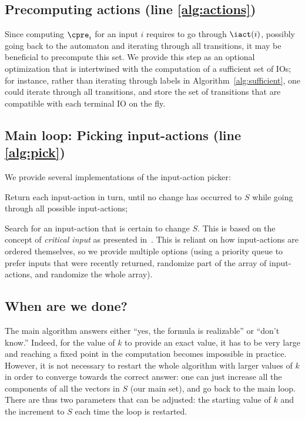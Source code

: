 \documentclass[runningheads,a4paper]{llncs}
\begin{document}
\subsection{Precomputing actions (line \ref{alg:actions})}

Since computing \(\cpre_i\) for an input \(i\) requires to go through
\(\iact(i)\), possibly going back to the automaton and iterating through all
transitions, it may be beneficial to precompute this set.  We provide this step
as an optional optimization that is intertwined with the computation of a
sufficient set of IOs; for instance, rather than iterating through labels in
Algorithm~\ref{alg:sufficient}, one could iterate through all transitions, and
store the set of transitions that are compatible with each terminal IO on the
fly.

\subsection{Main loop: Picking input-actions (line \ref{alg:pick})}\label{sec:io}

We provide several implementations of the input-action picker:
\begin{compactitem}
\item Return each input-action in turn, until no change has occurred to \(S\)
  while going through all possible input-actions;
\item Search for an input-action that is certain to change \(S\).  This is based
  on the concept of \emph{critical input} as presented in~\cite{bohy14}.  This
  is reliant on how input-actions are ordered themselves, so we provide multiple
  options (using a priority queue to prefer inputs that were recently returned,
  randomize part of the array of input-actions, and randomize the whole array).
\end{compactitem}

\subsection{When are we done?}\label{sec:k}

The main algorithm answers either ``yes, the formula is realizable'' or ``don't
know.''  Indeed, for the value of \(k\) to provide an exact value, it has to be
very large and reaching a fixed point in the computation becomes impossible in
practice.  However, it is not necessary to restart the whole algorithm with
larger values of \(k\) in order to converge towards the correct answer: one can
just increase all the components of all the vectors in \(S\) (our main set), and
go back to the main loop.  There are thus two parameters that can be adjusted:
the starting value of \(k\) and the increment to \(S\) each time the loop is
restarted.
\end{document}
